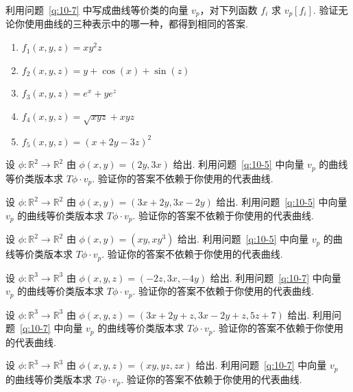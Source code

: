 \begin{question}\label{q:10-8}
利用问题~\ref{q:10-7} 中写成曲线等价类的向量 $v_p$，对下列函数 $f_i$ 求 $v_p[f_i]$. 验证无论你使用曲线的三种表示中的哪一种，都得到相同的答案.
\begin{enumerate}
  \item[(a)] $f_1(x,y,z)=xy^2z$
  \item[(b)] $f_2(x,y,z)=y+\cos(x)+\sin(z)$
  \item[(c)] $f_3(x,y,z)=e^x+ye^z$
  \item[(d)] $f_4(x,y,z)=\sqrt{xyz}+xyz$
  \item[(e)] $f_5(x,y,z)=(x+2y-3z)^2$
\end{enumerate}
\end{question}

\begin{question}\label{q:10-9}
设 $\phi:\mathbb{R}^2\to\mathbb{R}^2$ 由 $\phi(x,y)=(2y,3x)$ 给出. 利用问题~\ref{q:10-5} 中向量 $v_p$ 的曲线等价类版本求 $T\phi\cdot v_p$. 验证你的答案不依赖于你使用的代表曲线.
\end{question}

\begin{question}\label{q:10-10}
设 $\phi:\mathbb{R}^2\to\mathbb{R}^2$ 由 $\phi(x,y)=(3x+2y,3x-2y)$ 给出. 利用问题~\ref{q:10-5} 中向量 $v_p$ 的曲线等价类版本求 $T\phi\cdot v_p$. 验证你的答案不依赖于你使用的代表曲线.
\end{question}

\begin{question}\label{q:10-11}
设 $\phi:\mathbb{R}^2\to\mathbb{R}^2$ 由 $\phi(x,y)=(xy,xy^3)$ 给出. 利用问题~\ref{q:10-5} 中向量 $v_p$ 的曲线等价类版本求 $T\phi\cdot v_p$. 验证你的答案不依赖于你使用的代表曲线.
\end{question}

\begin{question}\label{q:10-12}
设 $\phi:\mathbb{R}^3\to\mathbb{R}^3$ 由 $\phi(x,y,z)=(-2z,3x,-4y)$ 给出. 利用问题~\ref{q:10-7} 中向量 $v_p$ 的曲线等价类版本求 $T\phi\cdot v_p$. 验证你的答案不依赖于你使用的代表曲线.
\end{question}

\begin{question}\label{q:10-13}
设 $\phi:\mathbb{R}^3\to\mathbb{R}^3$ 由 $\phi(x,y,z)=(3x+2y+z,3x-2y+z,5z+7)$ 给出. 利用问题~\ref{q:10-7} 中向量 $v_p$ 的曲线等价类版本求 $T\phi\cdot v_p$. 验证你的答案不依赖于你使用的代表曲线.
\end{question}

\begin{question}\label{q:10-14}
设 $\phi:\mathbb{R}^3\to\mathbb{R}^3$ 由 $\phi(x,y,z)=(xy,yz,zx)$ 给出. 利用问题~\ref{q:10-7} 中向量 $v_p$ 的曲线等价类版本求 $T\phi\cdot v_p$. 验证你的答案不依赖于你使用的代表曲线.
\end{question}

